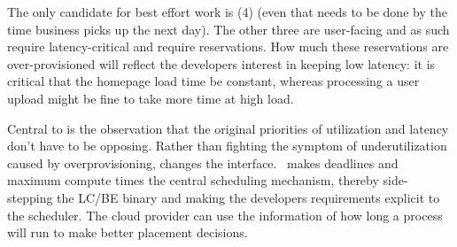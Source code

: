The only candidate for best effort work is (4) (even that needs to be done by
the time business picks up the next day). The other three are user-facing and as
such require latency-critical and require reservations. How much these
reservations are over-provisioned will reflect the developers interest in
keeping low latency: it is critical that the homepage load time be constant,
whereas processing a user upload might be fine to take more time at high load.

Central to \textit{\sysname{}} is the observation that the original priorities
of utilization and latency don't have to be opposing. Rather than fighting the
symptom of underutilization caused by overprovisioning, \sysname{} changes the
interface.\ \sysname{} makes deadlines and maximum compute times the central
scheduling mechanism, thereby side-stepping the LC/BE binary and making the
developers requirements explicit to the scheduler. The cloud provider can use
the information of how long a process will run to make better placement
decisions.
